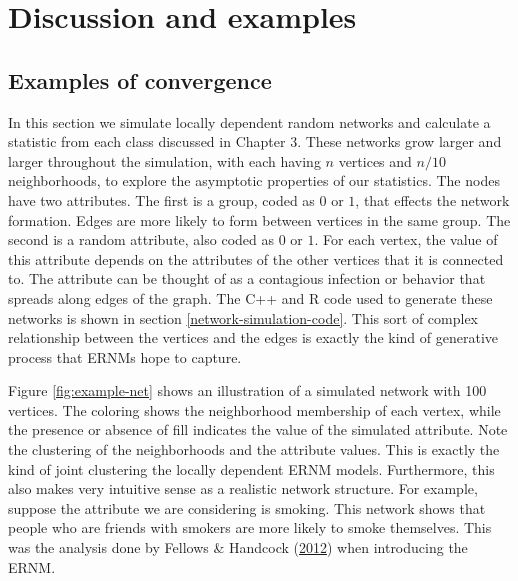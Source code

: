 \documentclass[12pt,twoside]{reedthesis}
\theoremstyle{definition}
\theoremstyle{definition}
\theoremstyle{remark}
\begin{document}
\chapter{Discussion and examples}\label{discussion-and-examples}

\section{Examples of convergence}\label{examples-of-convergence}

In this section we simulate locally dependent random networks and
calculate a statistic from each class discussed in Chapter 3. These
networks grow larger and larger throughout the simulation, with each
having \(n\) vertices and \(n/10\) neighborhoods, to explore the
asymptotic properties of our statistics. The nodes have two attributes.
The first is a group, coded as \(0\) or \(1\), that effects the network
formation. Edges are more likely to form between vertices in the same
group. The second is a random attribute, also coded as \(0\) or \(1\).
For each vertex, the value of this attribute depends on the attributes
of the other vertices that it is connected to. The attribute can be
thought of as a contagious infection or behavior that spreads along
edges of the graph. The C++ and R code used to generate these networks
is shown in section \ref{network-simulation-code}. This sort of complex
relationship between the vertices and the edges is exactly the kind of
generative process that ERNMs hope to capture.

Figure \ref{fig:example-net} shows an illustration of a simulated
network with 100 vertices. The coloring shows the neighborhood
membership of each vertex, while the presence or absence of fill
indicates the value of the simulated attribute. Note the clustering of
the neighborhoods and the attribute values. This is exactly the kind of
joint clustering the locally dependent ERNM models. Furthermore, this
also makes very intuitive sense as a realistic network structure. For
example, suppose the attribute we are considering is smoking. This
network shows that people who are friends with smokers are more likely
to smoke themselves. This was the analysis done by Fellows \& Handcock
(\protect\hyperlink{ref-Fellows2012}{2012}) when introducing the ERNM.
\end{document}
